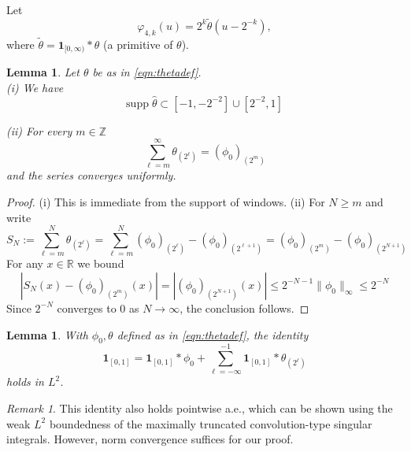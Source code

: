 \documentclass[12pt,reqno]{amsart}
\theoremstyle{plain}
\newtheorem{lemma}[theorem]{Lemma}
\numberwithin{equation}{section}
\theoremstyle{remark}
\newtheorem{rem}{Remark}[section]
\newcommand{\R}{{\mathbb R}}
\begin{document}
Let
\begin{equation}\label{eqn:varphi4kdef}
\varphi_{4,k}(u)=2^k\widetilde{\theta}(u-2^{-k}),
\end{equation}
where $\widetilde{\theta}=\mathbf{1}_{[0,\infty)}*\theta$ (a primitive of $\theta$).


\begin{lemma}\label{lem:bumpbasic}
Let $\theta$ be as in \eqref{eqn:thetadef}.\\

(i) We have
\begin{equation}\label{auto:theta-Fourier-support} \mathrm{supp}\;\widehat{\theta} \subset [-1,-2^{-2}]\cup [2^{-2},1] \end{equation}

(ii) For every $m\in\mathbb{Z}$
\begin{equation}\label{auto:theta-telescoping-sum} \sum_{\ell=m}^\infty \theta_{(2^\ell)} = (\phi_0)_{(2^m)} \end{equation}
and the series converges uniformly.
\end{lemma}

\begin{proof}
(i) This is immediate from the support of windows.
(ii) For  $N\ge m$ and write
\[ S_N := \sum_{\ell=m}^N \theta_{(2^\ell)} =  \sum_{\ell=m}^N (\phi_0)_{(2^\ell)} - (\phi_0)_{(2^{\ell+1})} = (\phi_0)_{(2^m)} - (\phi_0)_{(2^{N+1})} \]
For any $x\in \R$ we  bound
\[|S_N(x)-(\phi_0)_{(2^m)}(x)| = |(\phi_0)_{(2^{N+1})}(x)|  \le 2^{-N-1}\|\phi_0\|_\infty \le 2^{-N} \]
Since $2^{-N}$ converges   to $0$ as $N\to \infty$, the conclusion follows.
\end{proof}

\begin{lemma}\label{lem:chardecomp}
With $\phi_0,\theta$ defined as in \eqref{eqn:thetadef}, the identity
 \begin{equation}\label{auto:indicator-smoothing-decomposition} \mathbf{1}_{[0,1]} = \mathbf{1}_{[0,1]}* \phi_0 +  \sum_{\ell=-\infty}^{-1} \mathbf{1}_{[0,1]} * \theta_{(2^\ell)}  \end{equation}
holds in $L^2$.
\end{lemma}

\begin{rem}
    This identity also holds pointwise a.e., which can be shown using the weak $L^2$ boundedness of the maximally truncated convolution-type singular integrals. However, norm  convergence   suffices for our proof.
\end{rem}
\end{document}
